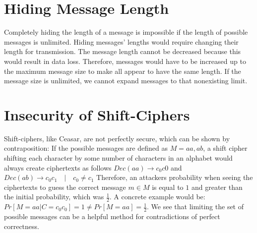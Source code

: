 \section{Hiding Message Length}

Completely hiding the length of a message is impossible if the length of possible messages is unlimited. Hiding messages' lengths would require changing their length for transmission. The message length cannot be decreased because this would result in data loss. Therefore, messages would have to be increased up to the maximum message size to make all appear to have the same length. If the message size is unlimited, we cannot expand messages to that nonexisting limit.

\section{Insecurity of Shift-Ciphers}

Shift-ciphers, like Ceasar, are not perfectly secure, which can be shown by contraposition: If the possible messages are defined as $M={aa, ab}$, a shift cipher shifting each character by some number of characters in an alphabet would always create ciphertexts as follows $Dec(aa) \rightarrow c_{0}c{0}$ and $Dec(ab) \rightarrow c_{0}c_{1} \quad|\quad c_{0} \neq c_{1}$ Therefore, an attackers probability when seeing the ciphertexts to guess the correct message $m \in M$ is equal to $1$ and greater than the initial probability, which was $\frac{1}{2}$. A concrete example would be: $Pr[M=aa | C=c_{0}c_{0}] = 1 \neq Pr[M=aa] = \frac{1}{2}$. We see that limiting the set of possible messages can be a helpful method for contradictions of perfect correctness.